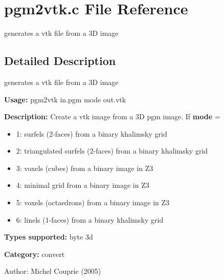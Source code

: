 \section{pgm2vtk.c File Reference}
\label{pgm2vtk_8c}
generates a vtk file from a 3D image 



\subsection{Detailed Description}
generates a vtk file from a 3D image 

{\bf Usage:} pgm2vtk in.pgm mode out.vtk

{\bf Description:} Create a vtk image from a 3D pgm image. If {\bf mode} = \begin{itemize}
\item 1: surfels (2-faces) from a binary khalimsky grid \item 2: triangulated surfels (2-faces) from a binary khalimsky grid \item 3: voxels (cubes) from a binary image in Z3 \item 4: minimal grid from a binary image in Z3 \item 5: voxels (octaedrons) from a binary image in Z3 \item 6: linels (1-faces) from a binary khalimsky grid\end{itemize}
{\bf Types supported:} byte 3d

{\bf Category:} convert

\begin{Desc}
\item[Author:]Michel Couprie (2005) \end{Desc}
